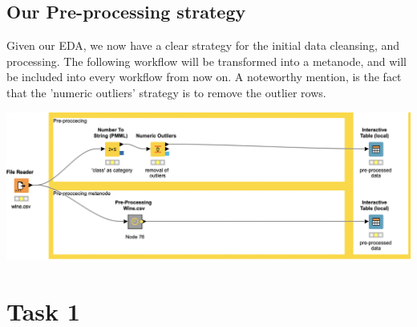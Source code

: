 \documentclass[11pt]{article}
\begin{document}
		\subsection*{Our Pre-processing strategy}
			Given  our EDA, we now have a clear strategy for the initial data cleansing, and processing. The following workflow will be transformed into a metanode, and will be included into every workflow from now on. A noteworthy mention, is the fact that the 'numeric outliers' strategy is to remove the outlier rows.
			\iftrue
			\begin{center}
				\includegraphics[scale=0.5]{res/t0/t05/t05-workflow}
			\end{center}
			\fi
			

	\section*{Task 1}
\end{document}
